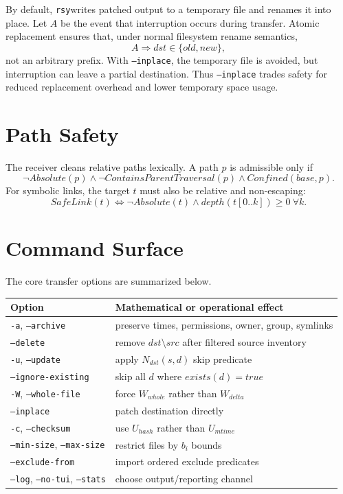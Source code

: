 \documentclass[11pt]{article}
\newcommand{\rsy}{\texttt{rsy}}
\begin{document}
By default, \rsy writes patched output to a temporary file and renames it into place. Let $A$ be the event that interruption occurs during transfer. Atomic replacement ensures that, under normal filesystem rename semantics,
\begin{equation}
  A \Rightarrow dst \in \{old, new\},
\end{equation}
not an arbitrary prefix. With \texttt{--inplace}, the temporary file is avoided, but interruption can leave a partial destination. Thus \texttt{--inplace} trades safety for reduced replacement overhead and lower temporary space usage.

\section{Path Safety}

The receiver cleans relative paths lexically. A path $p$ is admissible only if
\begin{equation}
  \neg Absolute(p) \land \neg ContainsParentTraversal(p) \land Confined(base,p).
\end{equation}
For symbolic links, the target $t$ must also be relative and non-escaping:
\begin{equation}
  SafeLink(t) \iff \neg Absolute(t) \land depth(t[0..k])\ge0\ \forall k.
\end{equation}

\section{Command Surface}

The core transfer options are summarized below.

\begin{center}
\begin{tabular}{ll}
\toprule
Option & Mathematical or operational effect \\
\midrule
\texttt{-a}, \texttt{--archive} & preserve times, permissions, owner, group, symlinks \\
\texttt{--delete} & remove $dst\setminus src$ after filtered source inventory \\
\texttt{-u}, \texttt{--update} & apply $N_{dst}(s,d)$ skip predicate \\
\texttt{--ignore-existing} & skip all $d$ where $exists(d)=true$ \\
\texttt{-W}, \texttt{--whole-file} & force $W_{whole}$ rather than $W_{delta}$ \\
\texttt{--inplace} & patch destination directly \\
\texttt{-c}, \texttt{--checksum} & use $U_{hash}$ rather than $U_{mtime}$ \\
\texttt{--min-size}, \texttt{--max-size} & restrict files by $b_i$ bounds \\
\texttt{--exclude-from} & import ordered exclude predicates \\
\texttt{--log}, \texttt{--no-tui}, \texttt{--stats} & choose output/reporting channel \\
\bottomrule
\end{tabular}
\end{center}
\end{document}
